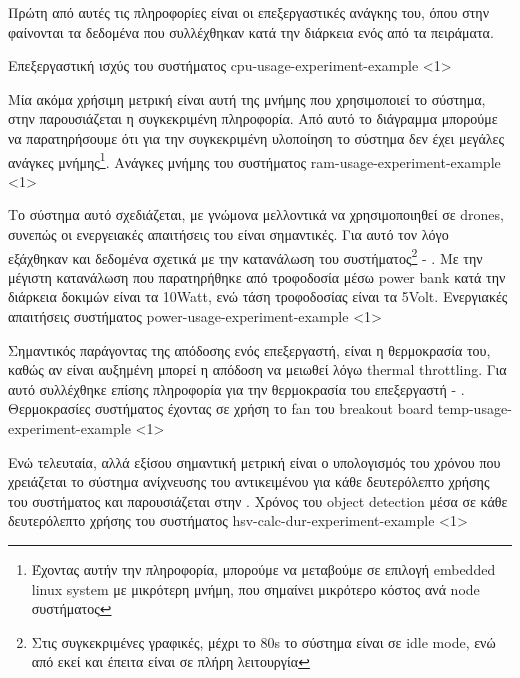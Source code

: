 Πρώτη από αυτές τις πληροφορίες είναι οι επεξεργαστικές ανάγκης του, όπου στην 
φαίνονται τα δεδομένα που συλλέχθηκαν κατά την διάρκεια ενός από τα πειράματα. 

{Επεξεργαστική ισχύς του συστήματος}%
{cpu-usage-experiment-example}%
<1>

Μία ακόμα χρήσιμη μετρική είναι αυτή της μνήμης που χρησιμοποιεί το σύστημα, στην 
παρουσιάζεται η συγκεκριμένη πληροφορία. Από αυτό το διάγραμμα μπορούμε να παρατηρήσουμε ότι για την συγκεκριμένη υλοποίηση το σύστημα δεν έχει μεγάλες ανάγκες μνήμης\footnote{Έχοντας αυτήν την πληροφορία, μπορούμε να μεταβούμε σε επιλογή embedded linux system με μικρότερη μνήμη, που σημαίνει μικρότερο κόστος ανά node συστήματος}.
{Ανάγκες μνήμης του συστήματος}%
{ram-usage-experiment-example}%
<1>

Το σύστημα αυτό σχεδιάζεται, με γνώμονα μελλοντικά να χρησιμοποιηθεί σε drones, συνεπώς οι ενεργειακές απαιτήσεις του είναι σημαντικές. Για αυτό τον λόγο ε\-ξά\-χθη\-καν και δεδομένα σχετικά με την κατανάλωση του συστήματος\footnote{Στις συγκεκριμένες γραφικές, μέχρι το 80s το σύστημα είναι σε idle mode, ενώ από εκεί και έπειτα είναι σε πλήρη λειτουργία} - . Με την μέγιστη κατανάλωση που παρατηρήθηκε από τροφοδοσία μέσω power bank κατά την διάρκεια δοκιμών είναι τα 10Watt, ενώ τάση τροφοδοσίας είναι τα 5Volt.
{Ενεργιακές απαιτήσεις συστήματος}%
{power-usage-experiment-example}%
<1>

Σημαντικός παράγοντας της απόδοσης ενός επεξεργαστή, είναι η θερμοκρασία του, καθώς αν είναι αυξημένη μπορεί η απόδοση να μειωθεί λόγω thermal throttling. Για αυτό συλλέχθηκε επίσης πληροφορία για την θερμοκρασία του επεξεργαστή - . 
{Θερμοκρασίες συστήματος έχοντας σε χρήση το fan του breakout board}%
{temp-usage-experiment-example}%
<1>

Ενώ τελευταία, αλλά εξίσου σημαντική μετρική είναι ο υπολογισμός του χρόνου που χρειάζεται το σύστημα ανίχνευσης του αντικειμένου για κάθε δευτερόλεπτο χρήσης του συστήματος και παρουσιάζεται στην .
{Χρόνος του object detection μέσα σε κάθε δευτερόλεπτο χρήσης του συστήματος}%
{hsv-calc-dur-experiment-example}%
<1>

